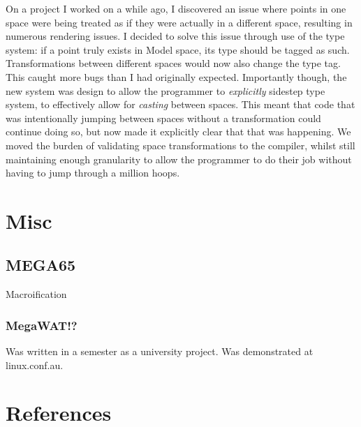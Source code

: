 \documentclass{article}
\begin{document}
On a project I worked on a while ago, I discovered an issue where points in
one space were being treated as if they were actually in a different space,
resulting in numerous rendering issues.
I decided to solve this issue through use of the type system:
if a point truly exists in Model space, its type should be tagged as such.
Transformations between different spaces would now also change the type tag.
This caught more bugs than I had originally expected.
Importantly though, the new system was design to allow the programmer to
\emph{explicitly} sidestep type system, to effectively allow for \emph{casting}
between spaces.
This meant that code that was intentionally jumping between spaces without
a transformation could continue doing so,
but now made it explicitly clear that that was happening.
We moved the burden of validating space transformations to the compiler,
whilst still maintaining enough granularity\cite{complexity-and-granularity}
to allow the programmer to do their job without having to jump through a
million hoops.

\section[misc]{Misc}

\cite{100-rabbits}
\cite{xxiivv}
\cite{plan-9}

\subsection[mega65]{MEGA65}

Macroification
\cite{understandable-computers}
\cite{fpga-based-mobile-phone}
\cite{megawat}

\subsubsection[megawat]{MegaWAT!?}

Was written in a semester as a university project\cite{megawat}.
Was demonstrated at linux.conf.au\cite{fpga-based-mobile-phone}.

\newpage

\section[references]{References}



\end{document}
